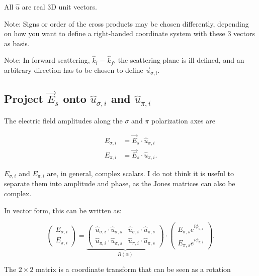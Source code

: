 \documentclass{article}
\begin{document}
All $\hat{u}$ are real 3D unit vectors.

Note: Signs or order of the cross products may be chosen differently, depending on how you want to define a right-handed coordinate system with these 3 vectors as basis.

Note: In forward scattering, $\hat{k}_i = \hat{k}_f$, the scattering plane is ill defined, and an arbitrary direction has to be chosen to define $\vec{u}_{\sigma,i}$.

\subsection{Project $\vec{E}_s$ onto $\hat{u}_{\sigma,i}$ and $\hat{u}_{\pi,i}$}

The electric field amplitudes along the $\sigma$ and $\pi$ polarization axes are

\begin{eqnarray}
  E_{\sigma,i}
  &=
  \vec{E}_s \cdot \hat{u}_{\sigma,i}
  \label{eq5}
  \\
  E_{\pi,i}
  &=
  \vec{E}_s \cdot \hat{u}_{\pi,i}.
  \label{eq6}
\end{eqnarray}

$E_{\sigma,i}$ and $E_{\pi,i}$ are, in general, complex scalars.
I do not think it is useful to separate them into amplitude and phase, as the Jones matrices can also be complex.

In vector form, this can be written as:

\begin{equation}
  \left( \begin{array}{c}
    E_{\sigma,i} \\
    E_{\pi,i}
  \end{array} \right)
  =
  \underbrace{
  \left( \begin{array}{cc}
    \hat{u}_{\sigma,i} \cdot \hat{u}_{\sigma,s} &
    \hat{u}_{\sigma,i} \cdot \hat{u}_{\pi,s} \\
    \hat{u}_{\pi,i} \cdot \hat{u}_{\sigma,s} &
    \hat{u}_{\pi,i} \cdot \hat{u}_{\pi,s} 
  \end{array} \right)
  }_{R(\alpha)}
  \cdot
  \left( \begin{array}{c}
    E_{\sigma,s} e^{i \phi_{\sigma,i}} \\
    E_{\pi,s} e^{i \phi_{\pi,i}}
  \end{array} \right).
\end{equation}

The $2\times 2$ matrix is a coordinate transform that can be seen as a rotation
\end{document}

